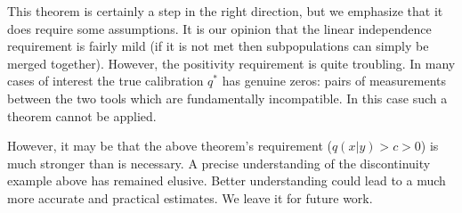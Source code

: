 This theorem is certainly a step in the right direction, but we emphasize that it does require some assumptions.  It is our opinion that the linear independence requirement is fairly mild (if it is not met then subpopulations can simply be merged together).  However, the positivity requirement is quite troubling.  In many cases of interest the true calibration $q^*$ has genuine zeros: pairs of measurements between the two tools which are fundamentally incompatible.  In this case such a theorem cannot be applied.  

However, it may be that the above theorem's requirement ($q(x|y)>c>0$) is much stronger than is necessary.  A precise understanding of the discontinuity example above has remained elusive.  Better understanding could lead to a much more accurate and practical estimates.  We leave it for future work.







































